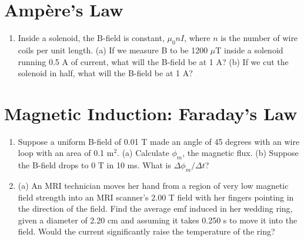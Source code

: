 \documentclass{article}
\begin{document}
\section{Amp\`{e}re's Law}

\begin{enumerate}
\item Inside a solenoid, the B-field is constant, $\mu_0 n I$, where $n$ is the number of wire coils per unit length.  (a) If we measure B to be 1200 $\mu$T inside a solenoid running 0.5 A of current, what will the B-field be at 1 A? (b) If we cut the solenoid in half, what will the B-field be at 1 A? \\ \vspace{2cm}
\end{enumerate}

\section{Magnetic Induction: Faraday's Law}

\begin{enumerate}
\item Suppose a uniform B-field of 0.01 T made an angle of 45 degrees with an wire loop with an area of 0.1 m$^2$.  (a) Calculate $\phi_m$, the magnetic flux. (b) Suppose the B-field drops to 0 T in 10 ms.  What is $\Delta \phi_m / \Delta t$? \\ \vspace{2cm}
\item (a) An MRI technician moves her hand from a region of very low magnetic field strength into an MRI scanner’s 2.00 T field with her fingers pointing in the direction of the field. Find the average emf induced in her wedding ring, given a diameter of 2.20 cm and assuming it takes 0.250 s to move it into the field. Would the current significantly raise the temperature of the ring? \\ \vspace{4cm}
\end{enumerate}
\end{document}
